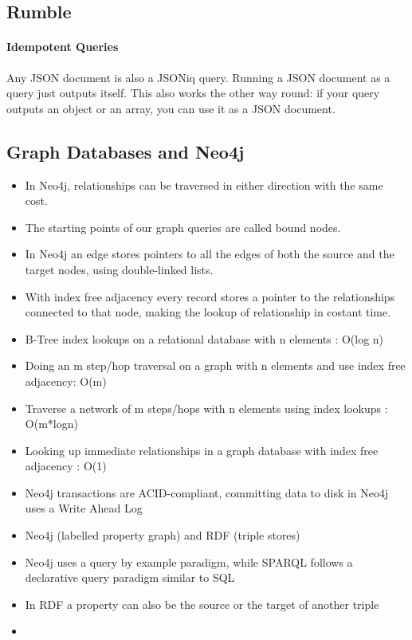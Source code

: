 \subsection{Rumble}


\paragraph{Idempotent Queries}
Any JSON document is also a JSONiq query. Running a JSON document as a query just outputs itself. This also works the other way round: if your query outputs an object or an array, you can use it as a JSON document.








\subsection{Graph Databases and Neo4j}



\begin{itemize}
    \item In Neo4j, relationships can be traversed in either direction with the same cost.
    \item The starting points of our graph queries are called bound nodes.
    \item In Neo4j an edge stores pointers to all the edges of both the source and the target nodes, using double-linked lists.
    \item With index free adjacency every record stores a pointer to the relationships connected to that node, making the lookup of relationship in costant time.
    \item B-Tree index lookups on a relational database with n elements : O(log n)
    \item Doing an m step/hop traversal on a graph with n elements and use index free adjacency: O(m)
    \item Traverse a network of m steps/hops with n elements using index lookups : O(m*logn)
    \item Looking up immediate relationships in a graph database with index free adjacency : O(1)
    \item Neo4j transactions are ACID-compliant, committing data to disk in Neo4j uses a Write Ahead Log
    \item Neo4j (labelled property graph) and RDF (triple stores)
    \item Neo4j uses a query by example paradigm, while SPARQL follows a declarative query paradigm similar to SQL
    \item In RDF a property can also be the source or the target of another triple
    \item 
\end{itemize}



